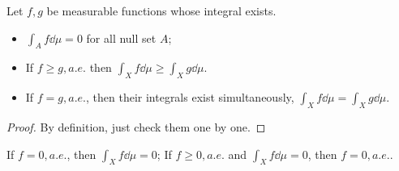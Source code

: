 \begin{theorem}
	Let $f,g$ be measurable functions whose integral exists.
    \begin{itemize}
		\item $\int_A f \dd \mu = 0$ for all null set $A$;
		\item If $f\ge g,a.e.$ then $\int_X f\dd \mu \ge \int_X g\dd \mu$.
		\item If $f=g, a.e.$, then their integrals
			exist simultaneously, $\int_X f\dd \mu = \int_X g\dd \mu$.
    \end{itemize}
\end{theorem}
\begin{proof}[Proof]
    By definition, just check them one by one.
\end{proof}

\begin{corollary}
    If $f=0,a.e.$, then $\int_X f\dd \mu = 0$;
	If $f\ge 0, a.e.$ and $\int_X f \dd \mu = 0$, then $f = 0,a.e.$.
\end{corollary}
